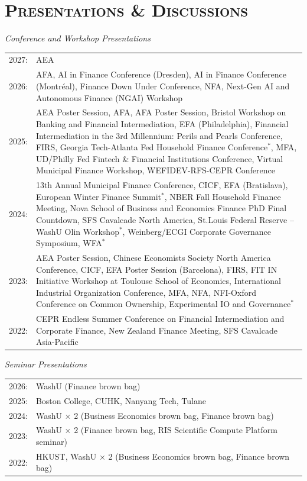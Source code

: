 \documentclass[11pt]{article}
\renewenvironment{itemize}{
  \begin{list}{}{
    \setlength{\leftmargin}{1.5em}
  }
}{
  \end{list}
}
\begin{document}
\section*{\textsc{Presentations \& Discussions}}
\begin{itemize}

\item{\textit{Conference and Workshop Presentations}}
\begin{tabularx}{\linewidth}{@{}l@{\quad}X@{}}
\\[-0.8em]
2027: & AEA \\
2026: & AFA, AI in Finance Conference (Dresden), AI in Finance Conference (Montréal), Finance Down Under Conference, NFA, Next-Gen AI and Autonomous Finance (NGAI) Workshop \\
2025: & AEA Poster Session, AFA, AFA Poster Session, Bristol Workshop on Banking and Financial Intermediation, EFA (Philadelphia), Financial Intermediation in the 3rd Millennium: Perils and Pearls Conference, FIRS, Georgia Tech-Atlanta Fed Household Finance Conference$^{*}$, MFA, UD/Philly Fed Fintech \& Financial Institutions Conference, Virtual Municipal Finance Workshop, WEFIDEV-RFS-CEPR Conference \\
2024: & 13th Annual Municipal Finance Conference, CICF, EFA (Bratislava), European Winter Finance Summit$^{*}$, NBER Fall Household Finance Meeting, Nova School of Business and Economics Finance PhD Final Countdown, SFS Cavalcade North America, St.\;Louis Federal Reserve – WashU Olin Workshop$^{*}$, Weinberg/ECGI Corporate Governance Symposium, WFA$^{*}$ \\
2023: & AEA Poster Session, Chinese Economists Society North America Conference, CICF, EFA Poster Session (Barcelona), FIRS, FIT IN Initiative Workshop at Toulouse School of Economics, International Industrial Organization Conference, MFA, NFA, NFI-Oxford Conference on Common Ownership, Experimental IO and Governance$^{*}$ \\
2022: & CEPR Endless Summer Conference on Financial Intermediation and Corporate Finance, New Zealand Finance Meeting, SFS Cavalcade Asia-Pacific \\
\end{tabularx}

\item{\textit{Seminar Presentations}}
\begin{tabularx}{\linewidth}{@{}l@{\quad}X@{}}
\\[-0.8em]
2026: & WashU (Finance brown bag) \\
2025: & Boston College, CUHK, Nanyang Tech, Tulane \\
2024: & WashU $\times$ 2 (Business Economics brown bag, Finance brown bag) \\
2023: & WashU $\times$ 2 (Finance brown bag, RIS Scientific Compute Platform seminar) \\
2022: & HKUST, WashU $\times$ 2 (Business Economics brown bag, Finance brown bag) \\
\end{tabularx}


\end{itemize}
\end{document}
